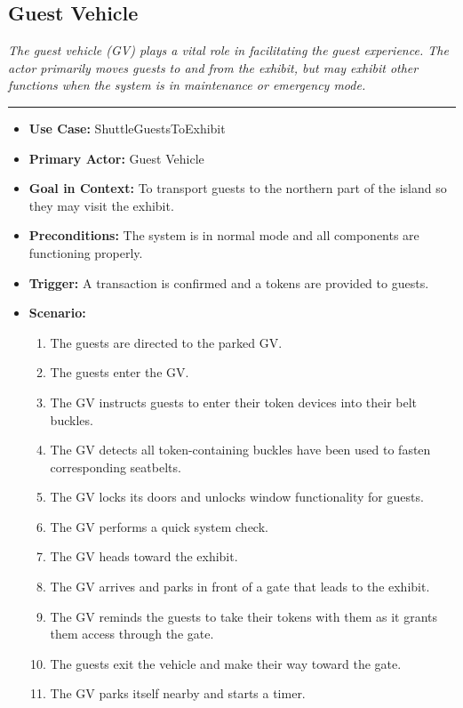 \documentclass[12pt]{article}
\begin{document}
    \subsection{Guest Vehicle}\label{carscenarios}
    \textit{The guest vehicle (GV) plays a vital role in facilitating the guest experience. The actor primarily
    moves guests to and from the exhibit, but may exhibit other functions when the system is in maintenance or
    emergency mode.}
    \par\noindent\rule{\textwidth}{0.4pt}    
    \begin{itemize}
        \item[]\textbf{Use Case:}                                
            ShuttleGuestsToExhibit

        \item[]\textbf{Primary Actor:}
            Guest Vehicle

        \item[]\textbf{Goal in Context:}
            To transport guests to the northern part of the island so they may 
            visit the exhibit.

        \item[]\textbf{Preconditions:}
            The system is in normal mode and all components are functioning properly.

        \item[]\textbf{Trigger:}
            A transaction is confirmed and a tokens are provided to guests.

        \item[]\textbf{Scenario:}
            \begin{enumerate}
                \item The guests are directed to the parked GV.
                \item The guests enter the GV.
                \item The GV instructs guests to enter their token devices into their belt buckles.
                \item The GV detects all token-containing buckles have been used to fasten corresponding seatbelts.
                \item The GV locks its doors and unlocks window functionality for guests.
                \item The GV performs a quick system check.
                \item The GV heads toward the exhibit.
                \item The GV arrives and parks in front of a gate that leads to the exhibit.
                \item The GV reminds the guests to take their tokens with them as it grants them access through the gate.
                \item The guests exit the vehicle and make their way toward the gate.
                \item The GV parks itself nearby and starts a timer.
            \end{enumerate}


\end{itemize}
\end{document}
